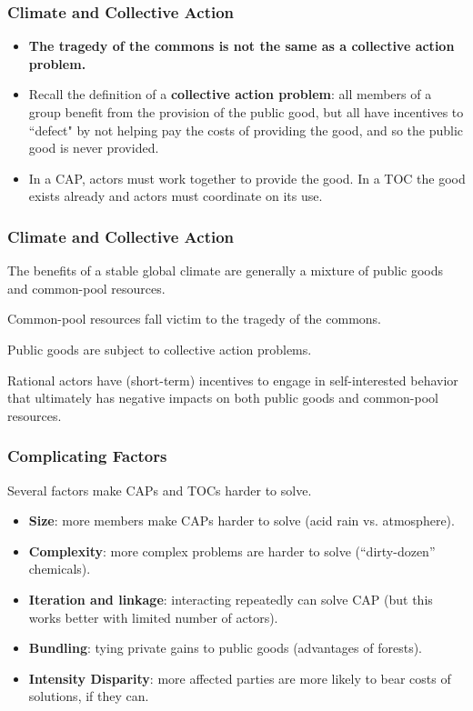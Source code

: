 \documentclass[handout]{beamer}
\begin{document}
\begin{frame} 
	\frametitle{\LARGE{Climate and Collective Action}}
	\begin{itemize}
		\item \textbf{The tragedy of the commons is not the same as a collective action problem.} \pause
		\item Recall the definition of a \textbf{collective action problem}: all members of a group benefit from the provision of the public good, but all have incentives to ``defect" by not helping pay the costs of providing the good, and so the public good is never provided. \pause
		\item In a CAP, actors must work together to provide the good. In a TOC the good exists already and actors must coordinate on its use.
	\end{itemize}
\end{frame}



\begin{frame} 
	\frametitle{\LARGE{Climate and Collective Action}}
	\begin{itemize}
		\large{
			\item The benefits of a stable global climate are generally a mixture of public goods and common-pool resources. \pause
			
			\item Common-pool resources fall victim to the tragedy of the commons. \pause
			
			\item Public goods are subject to collective action problems. \pause 
			
			\item Rational actors have (short-term) incentives to engage in self-interested behavior that ultimately has negative impacts on both public goods and common-pool resources.
		}
	\end{itemize}
\end{frame}

\begin{frame} 
	\frametitle{\LARGE{Complicating Factors}}
	Several factors make CAPs and TOCs harder to solve. \pause
	\begin{itemize}
		\item \textbf{Size}: more members make CAPs harder to solve (acid rain vs. atmosphere). \pause
		
		\item \textbf{Complexity}: more complex problems are harder to solve (``dirty-dozen'' chemicals). \pause
		
		\item \textbf{Iteration and linkage}: interacting repeatedly can solve CAP (but this works better with limited number of actors). \pause 
		
		\item \textbf{Bundling}: tying private gains to public goods (advantages of forests). \pause 
		
		\item \textbf{Intensity Disparity}: more affected parties are more likely to bear costs of solutions, if they can.
		
	\end{itemize}
\end{frame}
\end{document}
